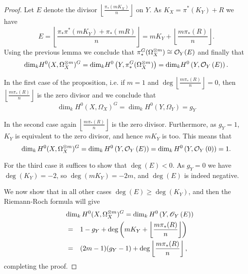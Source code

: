 \documentclass[11pt]{article} %
\theoremstyle{remark}\newtheorem*{rem}{Remark}
\newcommand{\cO}{{\cal O}}
\begin{document}
  \begin{proof}

    Let $E$ denote the divisor $\left\lfloor \frac{\pi_*(mK_X)}{n} \right\rfloor$ on $Y$. As $K_X=\pi^*(K_Y)+R$ we have
      \[ E = 
      \left \lfloor \frac{\pi_*\pi^*(mK_Y) + \pi_*(mR)}{n} \right \rfloor =
      mK_Y + \left \lfloor \frac{m\pi_*(R)}{n} \right \rfloor.\]
    Using the previous lemma we conclude that $\pi_*^G(\Omega_X^{\otimes m}) \cong \cO_Y (E)$ and finally that
      \begin{equation*}
	\textrm{dim}_k H^0(X,\Omega_X^{\otimes m})^G 
	 = \textrm{dim}_k H^0\left(Y, \pi_*^G(\Omega_X^{\otimes m})\right)
	  = \textrm{dim}_k H^0\left(Y, \cO_Y\left( E \right) \right).
      \end{equation*}


  In the first case of the proposition, i.e. if $m=1$ and $\deg \left\lfloor\frac{m\pi_*(R)}{n} \right\rfloor=0$, then $\left\lfloor\frac{m\pi_*(R)}{n} \right\rfloor$ is the zero divisor and we conclude that 
    \begin{equation*}
	\dim_kH^0(X,\Omega_X)^G = \dim_kH^0(Y, \Omega_Y) = g_Y
    \end{equation*}


  In the second case again $\left\lfloor \frac{m\pi_*(R)}{n} \right\rfloor$ is the zero divisor. 
  Furthermore, as $g_Y=1$, $K_Y$ is equivalent to the zero divisor, and hence $mK_Y$ is too. 
  This means that
    \begin{equation*}
      \dim_kH^0(X,\Omega_X^{\otimes m})^G = \dim_kH^0\left( Y,\cO_Y\left( E \right) \right) 
      = \dim_k  H^0\left( Y,\cO_Y\left( 0 \right) \right)
      = 1.
    \end{equation*}


  For the third case it suffices to show that $\deg \left( E \right) < 0$.
  As $g_Y=0$ we have $\deg(K_Y)=-2$, so $\deg(mK_Y)=-2m$, and $\deg \left( E \right)$ is indeed negative.



  We now show that in all other cases $\deg(E)\geq \deg(K_Y)$, and then the Riemann-Roch formula \cite[Ch. IV, {\S}1, Theorem 1.3]{hart} will give 
     \begin{eqnarray*}
	\lefteqn{\dim_kH^0(X,\Omega_X^{\otimes m})^G = \dim_kH^0\left(Y,\mathscr{O}_Y\left( E \right)\right)} \\
	& = & 1-g_Y+\deg\left(mK_Y+\left\lfloor{\frac{m\pi_*(R)}{n}}\right\rfloor\right) \\
	& = & (2m-1)(g_Y-1)+\deg\left\lfloor{\frac{m\pi_*(R)}{n}}\right\rfloor,
      \end{eqnarray*}
  completing the proof.



\end{proof}
\end{document}
